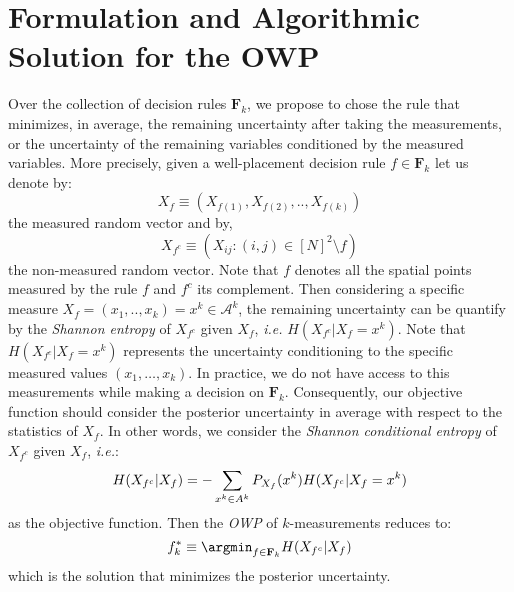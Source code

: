 
\section{Formulation and Algorithmic Solution for the OWP}
\label{sec_main}


Over the collection of decision rules $\mathbf{F}_k$, we propose to chose the rule that minimizes, in average, the remaining uncertainty after
taking the measurements, or the uncertainty of the remaining variables conditioned by the measured variables. More precisely, given a well-placement decision rule $f \in  \mathbf{F}_k$ let us denote by: 
\begin{equation}\label{eq_sec_OWP_1}
X_{f} \equiv ( X_{f(1)},X_{f(2)},..,X_{f(k)}) 
\end{equation}
the measured random vector and by, 
\begin{equation}\label{eq_sec_OWP_2}
X_{f^c} \equiv (X_{ij}: (i,j)\in [N]^2 \setminus f )
\end{equation}
the non-measured random vector. Note that $f$ denotes all the spatial points measured by the rule $f$ and $f^{c}$ its complement. Then considering a specific measure $X_{f}=(x_1,..,x_k) = x^k \in \mathcal{A}^k$, the remaining uncertainty can be quantify by the \emph{Shannon entropy} \cite{cover2006elements} of $X_{f^c}$ given $X_f$, \emph{i.e.} $H(X_{f^c}|X_{f}=x^k)$. Note that $H(X_{f^c}|X_{f}=x^k)$ represents the uncertainty conditioning to the specific measured values $(x_1,\ldots,x_k)$. In practice, we do not have access to this measurements while making a decision on $\mathbf{F}_k$. Consequently, our objective function should consider the posterior uncertainty in average with respect to the statistics of $X_{f}$. In other words, we consider the \emph{Shannon conditional entropy} \cite{cover2006elements} of $X_{f^c}$ given $X_{f}$, \emph{i.e.}: 
\begin{equation} \label{eq_sec_OWP_4}
\footnotesize{
H(X_{f^c}|X_{f}) =  -\displaystyle\sum_{x^k\in A^k} P_{X_{f}}(x^k) H(X_{f^c}|X_{f}=x^k)
}
\end{equation}
as the objective function. Then the \emph{OWP} of $k$-measurements reduces to:
\begin{equation} \label{eq_sec_OWP_5}
f_{k}^{*} \equiv \argmin_{f \in \mathbf{F}_k} H(X_{f^c}|X_f)
\end{equation}
which is the solution that minimizes the posterior uncertainty.

